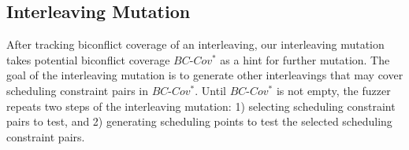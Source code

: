 

\subsection{Interleaving Mutation}
\label{ss:scheduler}

\newcommand{\segment}{segment graph\xspace}
\newcommand{\segments}{segment graphs\xspace}
\newcommand{\Segments}{Segment graphs\xspace}

%






After tracking biconflict coverage of an interleaving, our
interleaving mutation takes potential biconflict coverage
$BC\mbox{-}Cov^*$ as a hint for further mutation.
%
The goal of the interleaving mutation is to generate other
interleavings that may cover scheduling constraint pairs in
$BC\mbox{-}Cov^*$.
%
Until $BC\mbox{-}Cov^*$ is not empty, the fuzzer repeats two steps of
the interleaving mutation:
%
1) selecting scheduling constraint pairs to test, and
2) generating scheduling points to test the selected scheduling
constraint pairs.


